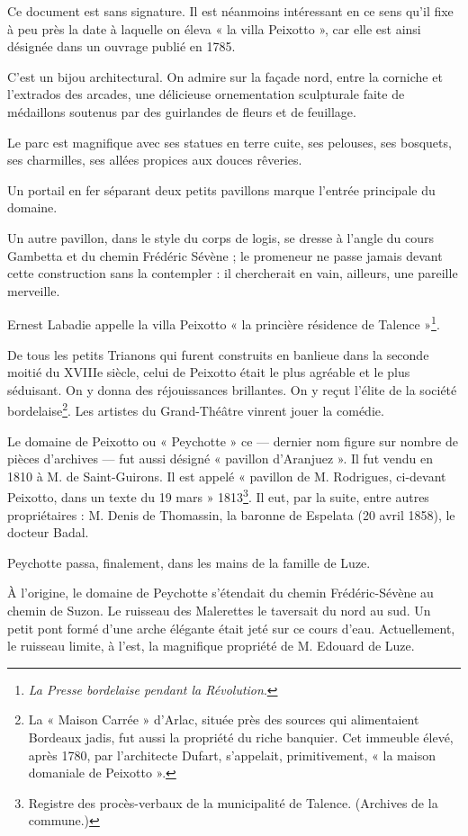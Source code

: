 Ce document est sans signature. Il est néanmoins intéressant en ce sens qu'il fixe à peu près la date à laquelle on éleva « la villa Peixotto », car elle est ainsi désignée dans un ouvrage publié en 1785.

C'est un bijou architectural. On admire sur la façade nord, entre la corniche et l'extrados des arcades, une délicieuse ornementation sculpturale faite de médaillons soutenus par des guirlandes de fleurs et de feuillage.

Le parc est magnifique avec ses statues en terre cuite, ses pelouses, ses bosquets, ses charmilles, ses allées propices aux douces rêveries.

Un portail en fer séparant deux petits pavillons marque l'entrée principale du domaine.

Un autre pavillon, dans le style du corps de logis, se dresse à l'angle du cours Gambetta et du chemin Frédéric Sévène ; le promeneur ne passe jamais devant cette construction sans la contempler : il chercherait en vain, ailleurs, une pareille merveille.

Ernest Labadie appelle la villa Peixotto « la princière résidence de Talence »\footnote{\textit{La Presse bordelaise pendant la Révolution}.}.

De tous les petits Trianons qui furent construits en banlieue dans la seconde moitié du XVIIIe siècle, celui de Peixotto était le plus agréable et le plus séduisant. On y donna des réjouissances brillantes. On y reçut l'élite de la société bordelaise\footnote{La « Maison Carrée » d'Arlac, située près des sources qui alimentaient Bordeaux jadis, fut aussi la propriété du riche banquier. Cet immeuble élevé, après 1780, par l'architecte Dufart, s'appelait, primitivement, « la maison domaniale de Peixotto ».}. Les artistes du Grand-Théâtre vinrent jouer la comédie.

Le domaine de Peixotto ou « Peychotte » ce — dernier nom figure sur nombre de pièces d'archives — fut aussi désigné « pavillon d'Aranjuez ». Il fut vendu en 1810 à M. de Saint-Guirons. Il est appelé « pavillon de M. Rodrigues, ci-devant Peixotto, dans un texte du 19 mars » 1813\footnote{Registre des procès-verbaux de la municipalité de Talence. (Archives de la commune.)}. Il eut, par la suite, entre autres propriétaires : M. Denis de Thomassin, la baronne de Espelata (20 avril 1858), le docteur Badal.

Peychotte passa, finalement, dans les mains de la famille de Luze.

À l'origine, le domaine de Peychotte s'étendait du chemin Frédéric-Sévène au chemin de Suzon. Le ruisseau des Malerettes le taversait du nord au sud. Un petit pont formé d'une arche élégante était jeté sur ce cours d'eau. Actuellement, le ruisseau limite, à l'est, la magnifique propriété de M. Edouard de Luze.

